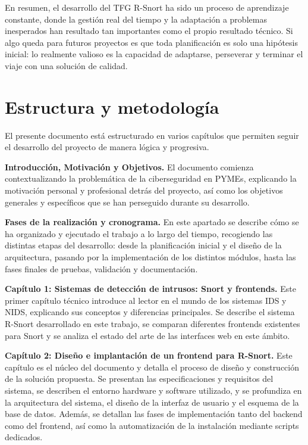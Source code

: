 \documentclass[11pt,a4paper,twoside]{report}
\begin{document}
En resumen, el desarrollo del TFG R-Snort ha sido un proceso de aprendizaje constante, donde la gestión real del tiempo y la adaptación a problemas inesperados han resultado tan importantes como el propio resultado técnico. Si algo queda para futuros proyectos es que toda planificación es solo una hipótesis inicial: lo realmente valioso es la capacidad de adaptarse, perseverar y terminar el viaje con una solución de calidad.

\section{Estructura y metodología}

El presente documento está estructurado en varios capítulos que permiten seguir el desarrollo del proyecto de manera lógica y progresiva.

\textbf{Introducción, Motivación y Objetivos.} El documento comienza contextualizando la problemática de la ciberseguridad en PYMEs, explicando la motivación personal y profesional detrás del proyecto, así como los objetivos generales y específicos que se han perseguido durante su desarrollo.\newline

\textbf{Fases de la realización y cronograma.} En este apartado se describe cómo se ha organizado y ejecutado el trabajo a lo largo del tiempo, recogiendo las distintas etapas del desarrollo: desde la planificación inicial y el diseño de la arquitectura, pasando por la implementación de los distintos módulos, hasta las fases finales de pruebas, validación y documentación.\newline

\textbf{Capítulo 1: Sistemas de detección de intrusos: Snort y frontends.} Este primer capítulo técnico introduce al lector en el mundo de los sistemas IDS y NIDS, explicando sus conceptos y diferencias principales. Se describe el sistema R-Snort desarrollado en este trabajo, se comparan diferentes frontends existentes para Snort y se analiza el estado del arte de las interfaces web en este ámbito.\newline

\textbf{Capítulo 2: Diseño e implantación de un frontend para R-Snort.} Este capítulo es el núcleo del documento y detalla el proceso de diseño y construcción de la solución propuesta. Se presentan las especificaciones y requisitos del sistema, se describen el entorno hardware y software utilizado, y se profundiza en la arquitectura del sistema, el diseño de la interfaz de usuario y el esquema de la base de datos. Además, se detallan las fases de implementación tanto del backend como del frontend, así como la automatización de la instalación mediante scripts dedicados.\newline
\end{document}
